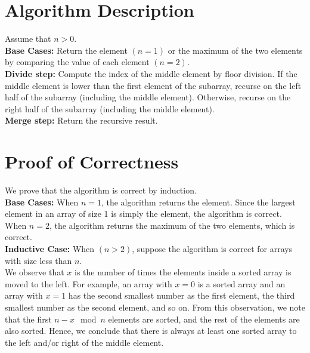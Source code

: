 \documentclass{article}
\author{\hmwkAuthorName}
\date{}
\begin{document}
    \section*{Algorithm Description} 
    
    Assume that $n>0$.
    \\
    
    \textbf{Base Cases:} Return the element $(n=1)$ or the maximum of the two elements by comparing the value of each element $(n=2)$.
    \\
    
    \textbf{Divide step:} Compute the index of the middle element by floor division. If the middle element is lower than the first element of the subarray, recurse on the left half of the subarray (including the middle element). Otherwise, recurse on the right half of the subarray (including the middle element).
    \\
    
    \textbf{Merge step:} Return the recursive result.

    \section*{Proof of Correctness} 
    
    We prove that the algorithm is correct by induction.
    \\
    
    \textbf{Base Cases:} When $n=1$, the algorithm returns the element. Since the largest element in an array of size 1 is simply the element, the algorithm is correct. When $n=2$, the algorithm returns the maximum of the two elements, which is correct.
    \\
    
    \textbf{Inductive Case:} When $(n>2)$, suppose the algorithm is correct for arrays with size less than $n$. 
    \\
    
    We observe that $x$ is the number of times the elements inside a sorted array is moved to the left. For example, an array with $x=0$ is a sorted array and an array with $x=1$ has the second smallest number as the first element, the third smallest number as the second element, and so on. From this observation, we note that the first $n - x \mod n$ elements are sorted, and the rest of the elements are also sorted. Hence, we conclude that there is always at least one sorted array to the left and/or right of the middle element.
    \\
    
\end{document}
